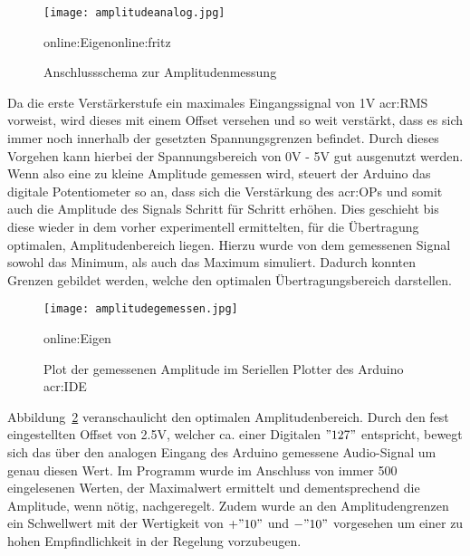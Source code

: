 \begin{figure}[H]
	\centering
	\texttt{[image: amplitudeanalog.jpg]}
	\caption[Anschlussschema zur Amplitudenmessung]{Anschlussschema zur Amplitudenmessung} 
	\gls{online:Eigen}\gls{online:fritz}
	\label{fig:amplitudeanalog}
\end{figure}

Da die erste Verstärkerstufe ein maximales Eingangssignal von 1V \gls{acr:RMS} vorweist, wird dieses mit einem Offset versehen und so weit verstärkt, dass es sich immer noch innerhalb der gesetzten Spannungsgrenzen befindet. Durch dieses Vorgehen kann hierbei der Spannungsbereich von 0V - 5V gut ausgenutzt werden. Wenn also eine zu kleine Amplitude gemessen wird, steuert der Arduino das digitale Potentiometer so an, dass sich die Verstärkung des \gls{acr:OP}s und somit auch die Amplitude des Signals Schritt für Schritt erhöhen. Dies geschieht bis diese wieder in dem vorher experimentell ermittelten, für die Übertragung optimalen, Amplitudenbereich liegen. Hierzu wurde von dem gemessenen Signal sowohl das Minimum, als auch das Maximum simuliert. Dadurch konnten Grenzen gebildet werden, welche den optimalen Übertragungsbereich darstellen. 

\begin{figure}[H]
	\centering
	\texttt{[image: amplitudegemessen.jpg]}
	\caption[Plot der gemessenen Amplitude im Seriellen Plotter der Arduino \gls{acr:IDE}]{Plot der gemessenen Amplitude im Seriellen Plotter des Arduino \gls{acr:IDE}} 
	\gls{online:Eigen}
	\label{fig:amplitudegemessen}
\end{figure}

Abbildung~\ref{fig:amplitudegemessen} veranschaulicht den optimalen Amplitudenbereich. Durch den fest eingestellten Offset von 2.5V, welcher ca. einer Digitalen $"127"$ entspricht, bewegt sich das über den analogen Eingang des Arduino gemessene Audio-Signal um genau diesen Wert. Im Programm wurde im Anschluss von immer 500 eingelesenen Werten, der Maximalwert ermittelt und dementsprechend die Amplitude, wenn nötig, nachgeregelt. Zudem wurde an den Amplitudengrenzen ein Schwellwert mit der Wertigkeit von $+"10"$ und $-"10"$ vorgesehen um einer zu hohen Empfindlichkeit in der Regelung vorzubeugen.
 
\newpage
